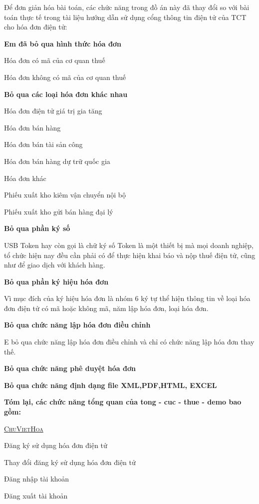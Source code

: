 Để đơn giản hóa bài toán, các chức năng trong đồ án này đã thay đổi so với bài toán thực tế trong tài liệu hướng dẫn sử dụng cổng thông tin điện tử của TCT cho hóa đơn điện tử:

\textbf{Em đã bỏ qua hình thức hóa đơn}

Hóa đơn có mã của cơ quan thuế

Hóa đơn không có mã của cơ quan thuế

\textbf{Bỏ qua các loại hóa đơn khác nhau}

Hóa đơn điện tử giá trị gia tăng

Hóa đơn bán hàng

Hóa đơn bán tài sản công

Hóa đơn bán hàng dự trữ quốc gia

Hóa đơn khác

Phiếu xuất kho kiêm vận chuyển nội bộ

Phiếu xuất kho gửi bán hàng đại lý

\textbf{Bỏ qua phần ký số}

USB Token hay còn gọi là chữ ký số Token là một thiết bị mà mọi doanh nghiệp, tổ chức hiện nay đều cần phải có để thực hiện khai báo và nộp thuế điện tử, cũng như để giao dịch với khách hàng.

\textbf{Bỏ qua phần ký hiệu hóa đơn}

Vì mục đích của ký hiệu hóa đơn là nhóm 6 ký tự thể hiện thông tin về loại hóa đơn điện tử có mã hoặc không mã, năm lập hóa đơn, loại hóa đơn.

\textbf{Bỏ qua chức năng lập hóa đơn điều chỉnh}

E bỏ qua chức năng lập hóa đơn điều chỉnh và chỉ có chức năng lập hóa đơn thay thế.

\textbf{Bỏ qua chức năng phê duyệt hóa đơn}

\textbf{Bỏ qua chức năng định dạng file XML,PDF,HTML, EXCEL}

\textbf{Tóm lại, các chức năng tổng quan của tong - cuc - thue - demo bao gồm:}



 
\underline{\textsc{ChuVietHoa}  } 




Đăng ký sử dụng hóa đơn điện tử

Thay đổi đăng ký sử dụng hóa đơn điện tử

Đăng nhập tài khoản

Đăng xuất tài khoản

